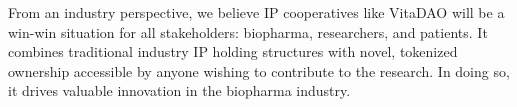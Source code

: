 \documentclass[12pt,letterpaper]{article}
\begin{document}
From an industry perspective, we believe IP cooperatives like VitaDAO will be a win-win situation for all stakeholders: biopharma, researchers, and patients. It combines traditional industry IP holding structures with novel, tokenized ownership accessible by anyone wishing to contribute to the research. In doing so, it drives valuable innovation in the biopharma industry.

\clearpage


\raggedright 


 
\end{document}
